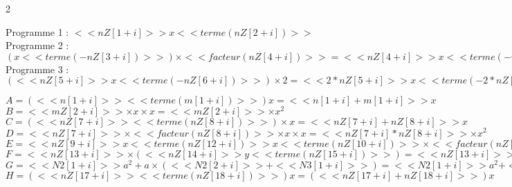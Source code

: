 

\setcounter{exo}{0}
\vfill
\begin{correction}
\begin{multicols}{2}
%
%


Programme 1 : $<<nZ[1+i]>> x <<terme(nZ[2+i])>>$\\
Programme 2 : $(x <<terme(-nZ[3+i])>>)\times <<facteur(nZ[4+i])>>= <<nZ[4+i]>>  x  << terme(- nZ[4+i] * nZ[3+i] ) >> $\\
Programme 3 : $( <<nZ[5+i]>> x <<terme(-nZ[6+i])>> )\times 2= <<2* nZ[5+i]>> x <<terme(-2*nZ[6+i])>>$




$A=(<<n[1+i]>>  <<terme(m[1+i])>>) x=<<n[1+i] +m[1+i]>> x$\\
$B=<<mZ[2+i]>> \times x\times x=<<mZ[2+i]>> \times x^2$\\
$C=(<<nZ[7+i]>> <<terme(nZ[8+i])>>) \times x=<<nZ[7+i] + nZ[8+i]>>  x$\\
$D=<<nZ[7+i]>>\times <<facteur(nZ[8+i])>>\times x\times x=<<nZ[7+i]* nZ[8+i]>>\times x^2$\\
$E= <<nZ[9+i]>>  x <<terme(nZ[12+i])>> x <<terme(nZ[10+i])>>\times <<facteur(nZ[11+i])>> = (<<nZ[9+i]>>  <<terme(nZ[12+i])>>) x <<terme(nZ[10+i] * nZ[11+i])>> = <<nZ[9+i] + nZ[12+i]>> x <<terme(nZ[10+i] * nZ[11+i])>> $\\
$F=<<nZ[13+i]>> \times (<<nZ[14+i]>>y <<terme(nZ[15+i])>>)  =<<nZ[13+i]>> \times <<facteur(nZ[14+i])>>y <<terme(nZ[13+i])>> \times <<facteur(nZ[15+i])>>
 =<<nZ[13+i]* nZ[14+i]>>y <<terme(nZ[13+i]*nZ[15+i])>> $\\
$G=<<N2[1+i]>> a^2+a\times (<<N2[2+i]>>+ <<N3[1+i]>>)=<<N2[1+i]>> a^2+<<N2[2+i] + N3[1+i]>>a$\\
$H= (<<nZ[17+i]>> <<terme(nZ[18+i])>>)x = (<<nZ[17+i] + nZ[18+i]>>)x$



\end{multicols}
\end{correction}
